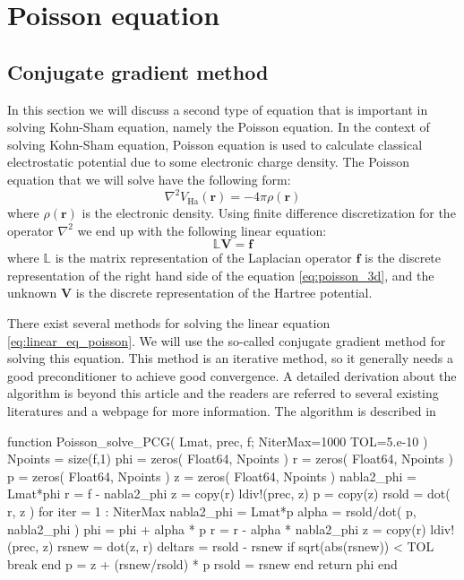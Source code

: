 \chapter{Poisson equation}
\label{chap:poisson_3d}

\section{Conjugate gradient method}

In this section we will discuss a second type of equation
that is important in solving Kohn-Sham equation,
namely the Poisson equation. In the
context of solving Kohn-Sham equation, Poisson equation is used to
calculate classical electrostatic potential due to some electronic
charge density.
The Poisson equation that we will solve have the following form:
\begin{equation}
\nabla^2 V_{\mathrm{Ha}}(\mathbf{r}) = -4\pi\rho(\mathbf{r})
\label{eq:poisson_3d}
\end{equation}
where $\rho(\mathbf{r})$ is the electronic density. Using finite
difference discretization for the operator $\nabla^2$ we end up with
the following linear equation:
\begin{equation}
\mathbb{L} \mathbf{V} = \mathbf{f}
\label{eq:linear_eq_poisson}
\end{equation}
where $\mathbb{L}$ is the matrix representation of the Laplacian operator
$\mathbf{f}$ is the discrete representation of the right hand side of the equation
\ref{eq:poisson_3d}, and the unknown $\mathbf{V}$ is the discrete representation of
the Hartree potential.

There exist several methods for solving the linear equation \ref{eq:linear_eq_poisson}.
We will use the so-called conjugate gradient method for solving this equation.
This method is an iterative method, so it generally needs a good preconditioner to
achieve good convergence. A detailed derivation about the algorithm is beyond this
article and the readers are referred to several existing literatures \cite{Hestenes1952,Shewchuk1994}
and a webpage \cite{wiki-Conjugate-gradient} for more
information. The algorithm is described in 

\begin{juliacode}
function Poisson_solve_PCG( Lmat, prec, f; NiterMax=1000 TOL=5.e-10 )
  Npoints = size(f,1)
  phi = zeros( Float64, Npoints )
  r = zeros( Float64, Npoints )
  p = zeros( Float64, Npoints )
  z = zeros( Float64, Npoints )
  nabla2_phi = Lmat*phi
  r = f - nabla2_phi
  z = copy(r)
  ldiv!(prec, z)
  p = copy(z)
  rsold = dot( r, z )
  for iter = 1 : NiterMax
    nabla2_phi = Lmat*p
    alpha = rsold/dot( p, nabla2_phi )
    phi = phi + alpha * p
    r = r - alpha * nabla2_phi
    z = copy(r)
    ldiv!(prec, z)
    rsnew = dot(z, r)
    deltars = rsold - rsnew
    if sqrt(abs(rsnew)) < TOL
      break
    end
    p = z + (rsnew/rsold) * p
    rsold = rsnew
  end
  return phi
end
\end{juliacode}


